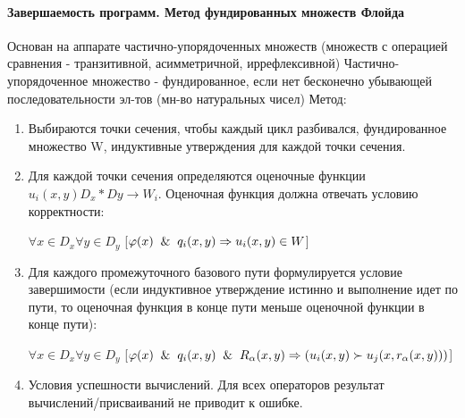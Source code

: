 \paragraph{Завершаемость программ. Метод фундированных множеств Флойда}
Основан на аппарате частично-упорядоченных множеств (множеств с операцией сравнения - транзитивной, асимметричной, иррефлексивной)
Частично-упорядоченное множество - фундированное, если нет бесконечно убывающей последовательности эл-тов (мн-во натуральных чисел)
Метод:
\begin{enumerate}
    \item Выбираются точки сечения, чтобы каждый цикл разбивался, фундированное множество W, индуктивные утверждения для каждой точки сечения.
    \item Для каждой точки сечения определяются оценочные функции $u_i(x,y) D_x * Dy \rightarrow W_i$. Оценочная функция должна отвечать условию корректности: 
    
    $\forall x  \in D_x \forall y \in D_y$ [$\varphi(x) \And q_i(x,y) \Rightarrow u_i(x, y) \in W$]
    \item Для каждого промежуточного базового пути формулируется условие завершимости (если индуктивное утверждение истинно и выполнение идет по пути, то оценочная функция в конце пути меньше оценочной функции в конце пути):
    
    $\forall x  \in D_x \forall y \in D_y$ [$\varphi(x) \And q_i(x,y) \And R_{\alpha}(x,y) \Rightarrow (u_i(x, y) \succ u_j(x, r_{\alpha}(x, y)))$]
    
    \item Условия успешности вычислений. Для всех операторов результат вычислений/присваиваний не приводит к ошибке.

\end{enumerate}


